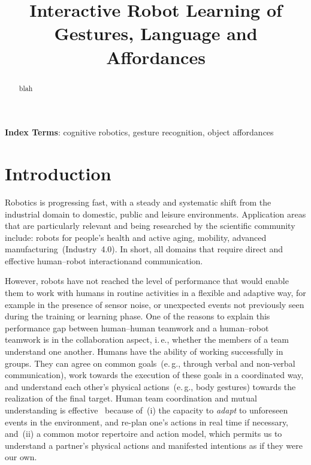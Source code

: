 \documentclass[a4paper]{article}
\title{Interactive Robot Learning of Gestures, Language and Affordances}
\newcommand{\eg}{e.\,g.}
\newcommand{\ie}{i.\,e.}
\newcommand{\hh}{human--human}
\newcommand{\hr}{human--robot}
\newcommand{\hri}{\hr{} interaction}
\begin{document}
\maketitle
%
\begin{abstract} %
  blah
\end{abstract}
\noindent\textbf{Index Terms}: cognitive robotics, gesture recognition, object affordances

\section{Introduction}


Robotics is progressing fast, with a steady and systematic shift from the industrial domain to domestic, public and leisure environments. Application areas that are particularly relevant and being researched by the scientific community include: robots for people's health and active aging, mobility, advanced manufacturing~(Industry~4.0). In short, all domains that require direct and effective \hri and communication.

However, robots have not reached the level of performance that would enable them to work with humans in routine activities in a flexible and adaptive way, for example in the presence of sensor noise, or unexpected events not previously seen during the training or learning phase. One of the reasons to explain this performance gap between \hh{} teamwork and a \hr{} teamwork is in the collaboration aspect, \ie, whether the members of a team understand one another. Humans have the ability of working successfully in groups. They can agree on common goals~(\eg, through verbal and non-verbal communication), work towards the execution of these goals in a coordinated way, and understand each other's physical actions~(\eg, body gestures) towards the realization of the final target. Human team coordination and mutual understanding is effective~\cite{ramnani:2004:natureneuro} because of~(i) the capacity to \emph{adapt} to unforeseen events in the environment, and re-plan one's actions in real time if necessary, and~(ii) a common motor repertoire and action model, which permits us to understand a partner's physical actions and manifested intentions as if they were our own.
\end{document}
